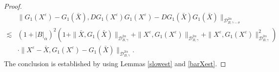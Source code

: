 \documentclass[10pt,a4paper]{amsart}
\begin{document}
\begin{proof}
	\begin{align*}
	&\|G_1(X^\varepsilon)-G_1(\bar{X}),DG_1(X^\varepsilon)G_1(X^\varepsilon)-DG_1(\bar{X})G_1(\bar{X})\|_{\mathcal{D}_{B,\gamma-\sigma}^{2\alpha} }  \nonumber\\
	\lesssim & (1+|B|_\alpha)^2 \left(1+\|\bar{X},G_1(\bar{X})\|_{\mathcal{D}_{B,\gamma}^{2\alpha}}+\|X^\varepsilon,G_1(X^\varepsilon)\|_{\mathcal{D}_{B,\gamma}^{2\alpha}} +\|X^\varepsilon,G_1(X^\varepsilon)\|_{\mathcal{D}_{ B,\gamma}^{2\alpha}}^2 \right) \nonumber\\
	& \cdot \|X^\varepsilon-\bar{X},G_1(X^\varepsilon)-G_1(\bar{X}) \|_{\mathcal{D}_{B,\gamma}^{2\alpha}}.	
	\end{align*}
The conclusion is established by using Lemmas \ref{slowest} and \ref{barXest}.	
	\end{proof}
\end{document}
